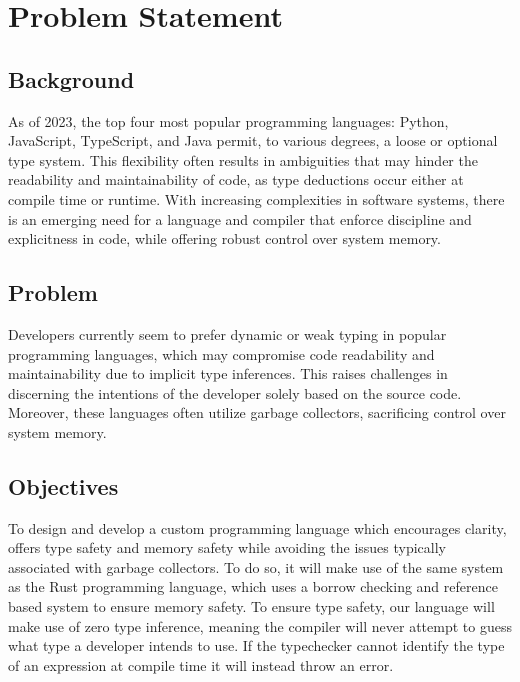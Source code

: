 \section{Problem Statement}
\label{sec:ProblemStatement}

\subsection{Background}

As of 2023, the top four most popular programming languages: Python, JavaScript,
TypeScript, and Java permit, to various degrees, a loose or optional type
system\cite{STACK}. This flexibility often results in ambiguities that may hinder the
readability and maintainability of code, as type deductions occur either at compile
time or runtime. With increasing complexities in software systems, there is an
emerging need for a language and compiler that enforce discipline and explicitness in
code, while offering robust control over system memory.

\subsection{Problem}

Developers currently seem to prefer dynamic or weak typing in popular programming
languages, which may compromise code readability and maintainability due to implicit
type inferences. This raises challenges in discerning the intentions of the developer
solely based on the source code. Moreover, these languages often utilize garbage
collectors, sacrificing control over system memory.

\subsection{Objectives}
\label{sec:Objectives}

To design and develop a custom programming language which encourages clarity, offers
type safety and memory safety while avoiding the issues typically associated with
garbage collectors. To do so, it will make use of the same system as the Rust programming
language, which uses a borrow checking and reference based system to ensure memory
safety\cite{RUST}. To ensure type safety, our language will make use of zero type
inference, meaning the compiler will never attempt to guess what type a developer
intends to use. If the typechecker cannot identify the type of an expression at
compile time it will instead throw an error. \\

